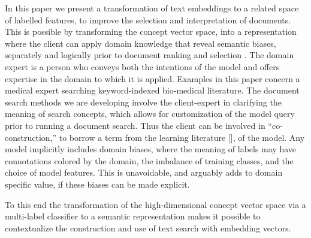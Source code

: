 In this paper we present a transformation of text embeddings to a related space of labelled features, to improve the selection and interpretation of documents. This is possible by transforming the concept vector space, into a representation where the client can apply domain knowledge that reveal semantic biases, separately and logically prior to document ranking and selection . 
The domain expert is a person who conveys both the intentions of the model and offers expertise in the domain to which it is applied. Examples in this paper concern a medical expert searching keyword-indexed bio-medical literature. The document search methods we are developing involve the client-expert in clarifying the meaning of search concepts, which allows for customization of the model query prior to running a document search.  Thus the client can be involved in ``co-construction,'' to borrow a term from the learning literature [], of the model.  Any model implicitly includes domain biases, where the meaning of labels may have connotations colored by the domain, the imbalance of training classes, and the choice of model features. This is unavoidable, and arguably adds to domain specific value, if these biases can be made explicit. 

To this end the transformation of the high-dimensional concept vector space via a multi-label classifier to a semantic representation  
makes it possible to contextualize the construction and use of text search with embedding vectors.  

